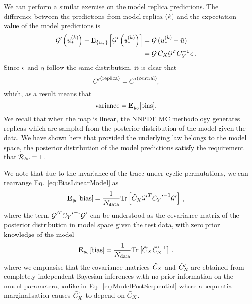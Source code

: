 We can perform a similar exercise on the model replica predictions. The
difference between the predictions from model replica $(k)$ and the
expectation value of the model predictions is
\begin{equation}
    \begin{split}
        {{\mathcal{G}}^{\prime}}\left(u_*^{(k)}\right) -
        \mathbf{E}_{\{ u_* \}} \left[ {{\mathcal{G}}^{\prime}}\left(u_*^{(k)}\right) \right] &=
        {{\mathcal{G}}^{\prime}} (u_*^{(k)} - \tilde{u}) \\
        &= {{\mathcal{G}}^{\prime}} \tilde{C}_X \mathcal{G}^T C_{Y}^{-1} \, \epsilon \, .
    \end{split}
\end{equation}
Since $\epsilon$ and $\eta$ follow the same distribution, it is clear that
\begin{equation}
    {{C}^{\prime}}^{(\rm replica)} = {{C}^{\prime}}^{(\rm central)},
\end{equation}
which, as a result means that
\begin{equation}
    {\rm variance} = \mathbf{E}_{y_0}[{\rm bias}].
\end{equation}
We recall that when the map is linear, the NNPDF MC methodology generates
replicas which are sampled from the posterior distribution of the model given
the data. We have shown here that provided the underlying law belongs to the
model space, the posterior distribution of the model predictions satisfy the
requirement that $\mathcal{R}_{bv} = 1$.

We note that due to the invariance of the trace under cyclic permutations, we
can rearrange Eq.~\ref{eq:BiasLinearModel} as
\begin{equation}
    \mathbf{E}_{y_0}[{\rm bias}] = \frac{1}{N_{\rm data}}
    {\rm Tr} \left[
        \tilde{C}_X
        {{\mathcal{G}}^{\prime}}^T {{C_{Y}}^{\prime}}^{-1} {{\mathcal{G}}^{\prime}}
    \right] \, ,
\end{equation}
where the term ${{\mathcal{G}}^{\prime}}^T {{C_{Y}}^{\prime}}^{-1}
{{\mathcal{G}}^{\prime}}$ can be understood as the covariance matrix of the posterior
distribution in model space given the test data, with zero prior knowledge of
the model \viz
\begin{equation}\label{eq:BiasTraceModelPost}
    \mathbf{E}_{y_0}[{\rm bias}] = \frac{1}{N_{\rm data}}
    {\rm Tr} \left[ \tilde{C}_X {\tilde{C}_X}^{ \prime -1} \right] \, ,
\end{equation}
where we emphasise that the covariance matrices $\tilde{C}_X$ and
${{\tilde{C}_X}^{\prime}}$ are obtained from completely independent Bayesian
inferences with no prior information on the model parameters, unlike in
Eq.~\ref{eq:ModelPostSequential} where a sequential marginalisation causes
${{\tilde{C}_X}^{\prime}}$ to depend on $\tilde{C}_X$.

